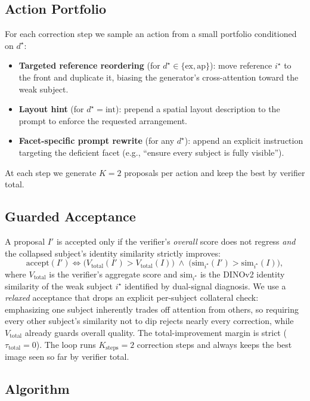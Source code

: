 \documentclass[letterpaper]{article}
\begin{document}
\subsection{Action Portfolio}
\label{sec:portfolio}

For each correction step we sample an action from a small portfolio conditioned on $d^\star$:
\begin{itemize}
\item \textbf{Targeted reference reordering} (for $d^\star\in\{\mathrm{ex},\mathrm{ap}\}$): move reference $i^\star$ to the front and duplicate it, biasing the generator's cross-attention toward the weak subject.
\item \textbf{Layout hint} (for $d^\star=\mathrm{int}$): prepend a spatial layout description to the prompt to enforce the requested arrangement.
\item \textbf{Facet-specific prompt rewrite} (for any $d^\star$): append an explicit instruction targeting the deficient facet (e.g., ``ensure every subject is fully visible'').
\end{itemize}
At each step we generate $K=2$ proposals per action and keep the best by verifier total.

\subsection{Guarded Acceptance}
\label{sec:accept}

A proposal $I'$ is accepted only if the verifier's \emph{overall} score does not regress \emph{and} the collapsed subject's identity similarity strictly improves:
\[
\mathrm{accept}(I') \iff \big(V_{\mathrm{total}}(I') > V_{\mathrm{total}}(I)\big) \;\wedge\; \big(\mathrm{sim}_{i^\star}(I') > \mathrm{sim}_{i^\star}(I)\big),
\]
where $V_{\mathrm{total}}$ is the verifier's aggregate score and $\mathrm{sim}_{i^\star}$ is the DINOv2 identity similarity of the weak subject $i^\star$ identified by dual-signal diagnosis. We use a \emph{relaxed} acceptance that drops an explicit per-subject collateral check: emphasizing one subject inherently trades off attention from others, so requiring every other subject's similarity not to dip rejects nearly every correction, while $V_{\mathrm{total}}$ already guards overall quality. The total-improvement margin is strict ($\tau_{\mathrm{total}}{=}0$). The loop runs $K_{\mathrm{steps}}{=}2$ correction steps and always keeps the best image seen so far by verifier total.

\subsection{Algorithm}
\end{document}
